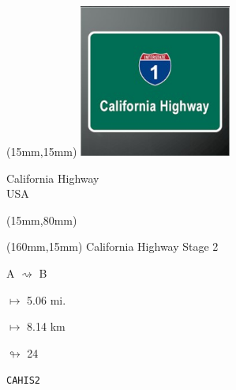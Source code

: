 \begin{textblock*}{50mm}(15mm,15mm)%
\includegraphics[width=50mm]{LG/2015-05-20_00077.png}
\par California Highway\\ USA
\end{textblock*}
\begin{textblock*}{185mm}(15mm,80mm)%
\end{textblock*}
\begin{textblock*}{40mm}(160mm,15mm)%
California Highway Stage 2
\par A $\rightsquigarrow$ B
\Large
\par$\mapsto$ 5.06 mi.
\par$\mapsto$ 8.14 km
\par$\looparrowright$ 24
\par\hfill\tiny\tt CAHIS2\\
\end{textblock*}
\null\newpage


